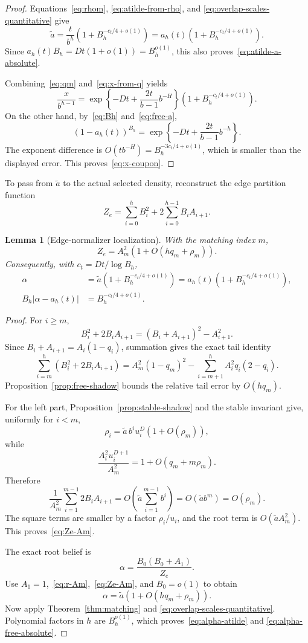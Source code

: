 \documentclass[11pt]{amsart}
\newtheorem{lemma}[theorem]{Lemma}
\theoremstyle{definition}
\begin{document}
\begin{proof}
Equations~\eqref{eq:rhom}, \eqref{eq:atilde-from-rho}, and
\eqref{eq:overlap-scales-quantitative} give
\[
 \widetilde a=\frac{t}{b^h}
 \left(1+B_h^{-c_t/4+o(1)}\right)
 =a_h(t)\left(1+B_h^{-c_t/4+o(1)}\right).
\]
Since $a_h(t)B_h=Dt(1+o(1))=B_h^{o(1)}$, this also proves~\eqref{eq:atilde-a-absolute}.

Combining~\eqref{eq:qm} and~\eqref{eq:x-from-q} yields
\[
 \frac{x}{b^{h-1}}
 =\exp\left\{-Dt+\frac{2t}{b-1}b^{-H}\right\}
 \left(1+B_h^{-c_t/4+o(1)}\right).
\]
On the other hand, by~\eqref{eq:Bh} and~\eqref{eq:free-a},
\[
 (1-a_h(t))^{B_h}
 =\exp\left\{-Dt+\frac{2t}{b-1}b^{-h}\right\}.
\]
The exponent difference is $O(tb^{-H})=B_h^{-3c_t/4+o(1)}$, which is smaller than the displayed error.  This proves~\eqref{eq:x-coupon}.
\end{proof}

To pass from $\widetilde a$ to the actual selected density, reconstruct the edge partition function
\[
 Z_e=\sum_{i=0}^hB_i^2+2\sum_{i=0}^{h-1}B_iA_{i+1}.
\]

\begin{lemma}[Edge-normalizer localization]\label{lem:Ze-localization}
With the matching index $m$,
\begin{equation}\label{eq:Ze-Am}
 Z_e=A_m^2\left(1+O(hq_m+\rho_m)\right).
\end{equation}
Consequently, with $c_t=Dt/\log B_h$,
\begin{align}
 \alpha&=\widetilde a\left(1+B_h^{-c_t/4+o(1)}\right)
 =a_h(t)\left(1+B_h^{-c_t/4+o(1)}\right),\label{eq:alpha-atilde}\\
 B_h|\alpha-a_h(t)|&=B_h^{-c_t/4+o(1)}.\label{eq:alpha-free-absolute}
\end{align}
\end{lemma}

\begin{proof}
For $i\ge m$,
\[
 B_i^2+2B_iA_{i+1}
 =(B_i+A_{i+1})^2-A_{i+1}^2.
\]
Since $B_i+A_{i+1}=A_i(1-q_i)$, summation gives the exact tail identity
\[
 \sum_{i=m}^h(B_i^2+2B_iA_{i+1})
 =A_m^2(1-q_m)^2
 -\sum_{i=m+1}^hA_i^2q_i(2-q_i).
\]
Proposition~\ref{prop:free-shadow} bounds the relative tail error by $O(hq_m)$.

For the left part, Proposition~\ref{prop:stable-shadow} and the stable invariant give, uniformly for $i<m$,
\[
 \rho_i=\widetilde a\,b^iu_i^D(1+O(\rho_m)),
\]
while
\[
 \frac{A_i^2u_i^{D+1}}{A_m^2}=1+O(q_m+m\rho_m).
\]
Therefore
\[
 \frac1{A_m^2}
 \sum_{i=1}^{m-1}2B_iA_{i+1}
 =O\!\left(\widetilde a\sum_{i=1}^{m-1}b^i\right)
 =O(\widetilde a b^m)
 =O(\rho_m).
\]
The square terms are smaller by a factor $\rho_i/u_i$, and the root term is $O(\widetilde a A_m^2)$.  This proves~\eqref{eq:Ze-Am}.

The exact root belief is
\[
 \alpha=\frac{B_0(B_0+A_1)}{Z_e}.
\]
Use $A_1=1$,~\eqref{eq:r-Am},~\eqref{eq:Ze-Am}, and $B_0=o(1)$ to obtain
\[
 \alpha=\widetilde a\left(1+O(hq_m+\rho_m)\right).
\]
Now apply Theorem~\ref{thm:matching} and
\eqref{eq:overlap-scales-quantitative}.  Polynomial factors in $h$ are
$B_h^{o(1)}$, which proves~\eqref{eq:alpha-atilde} and
\eqref{eq:alpha-free-absolute}.
\end{proof}
\end{document}
